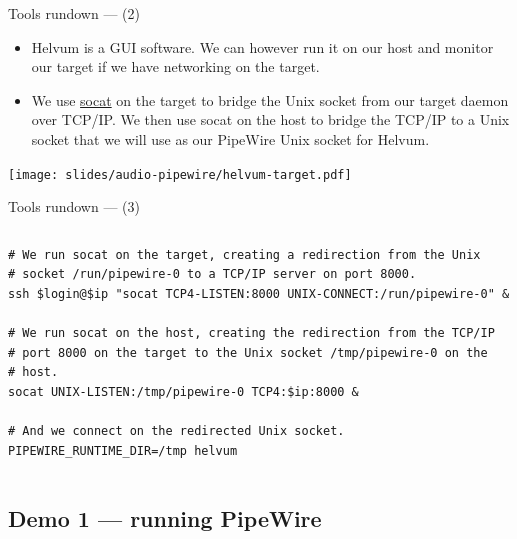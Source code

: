\begin{frame}{Tools rundown —  (2)}
  \begin{itemize}

  \item Helvum is a GUI software. We can however run it on our host and
    monitor our target if we have networking on the target.

  \item We use \href{http://www.dest-unreach.org/socat/}{socat} on the
    target to bridge the Unix socket from our target daemon over
    TCP/IP. We then use socat on the host to bridge the TCP/IP to a
    Unix socket that we will use as our PipeWire Unix socket for
    Helvum.

  \end{itemize}

  \begin{center}
    \texttt{[image: slides/audio-pipewire/helvum-target.pdf]}
  \end{center}

\end{frame}



\begin{frame}[fragile]{Tools rundown —  (3)}
  \begin{columns}

    \begin{block}{}
      \fontsize{9}{9}\selectfont
        \begin{verbatim}
# We run socat on the target, creating a redirection from the Unix
# socket /run/pipewire-0 to a TCP/IP server on port 8000.
ssh $login@$ip "socat TCP4-LISTEN:8000 UNIX-CONNECT:/run/pipewire-0" &

# We run socat on the host, creating the redirection from the TCP/IP
# port 8000 on the target to the Unix socket /tmp/pipewire-0 on the
# host.
socat UNIX-LISTEN:/tmp/pipewire-0 TCP4:$ip:8000 &

# And we connect on the redirected Unix socket.
PIPEWIRE_RUNTIME_DIR=/tmp helvum
        \end{verbatim}
      \end{block}

  \end{columns}
\end{frame}



\subsection{Demo 1 — running PipeWire}




